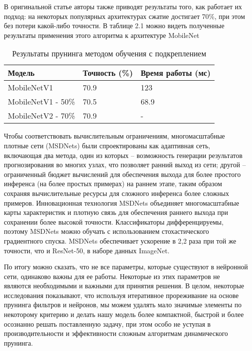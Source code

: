 \documentclass[oneside,final,12pt]{extreport}
\begin{document}
В оригинальной статье авторы также приводят результаты того, как работает их подход: на некоторых популярных архитектурах сжатие достигает 70\%, при этом без потери какой-либо точности. В таблице 2.1 можно видеть полученные результаты применения этого алгоритма к архитектуре MobileNet
\begin{table}[H]
\caption{Результаты прунинга методом обучения с подкреплением}
\label{table_1}
\begin{tabularx}{\textwidth}{|X|X|X|} %
\hline
Модель & Точность (\%) & Время работы (мс) \\ \hline
MobileNetV1 & 70.9 & 123 \\ 
MobileNetV1 - 50\% & 70.5 & 68.9 \\ 
MobileNetV2 - 70\% & 70.9 & - \\ \hline
\end{tabularx}
\end{table}

Чтобы соответствовать вычислительным ограничениям, многомасштабные плотные сети (MSDNets) были спроектированы  как адаптивная сеть, включающая два метода, один из которых – возможность генерации результатов прогнозирования во многих узлах, что позволяет ранний выход из сети; другой – ограниченный бюджет вычислений для обеспечения выхода для более  простого инференса (на более простых примерах) на раннем этапе, таким образом сохраняя вычислительные ресурсы для сложного инференса более сложных примеров. Инновационная технология MSDNets объединяет многомасштабные карты характеристик и плотную связь для обеспечения раннего выхода при сохранении более высокой точности. Классификаторы дифференцируемы, поэтому MSDNets можно обучать с использованием стохастического градиентного спуска. MSDNets обеспечивает ускорение в 2,2 раза при той же точности, что и ResNet-50, в наборе данных ImageNet.

По итогу можно сказать, что не все параметры, которые существуют в нейронной сети, 
одинаково важны для ее работы. Некоторые из этих параметров не являются необходимыми и важными для принятия решения. В целом, некоторые исследования показывают, что используя итеративное прореживание на основе прунинга фильтров и нейронов, мы можем удалять мало значимые элементы по некоторому критерию и делать нашу модель более компактной, быстрой и более осознанно решать поставленную задачу, при этом особо не уступая в производительности и эффективности сложным алгоритмам динамического прунинга.
\end{document}
